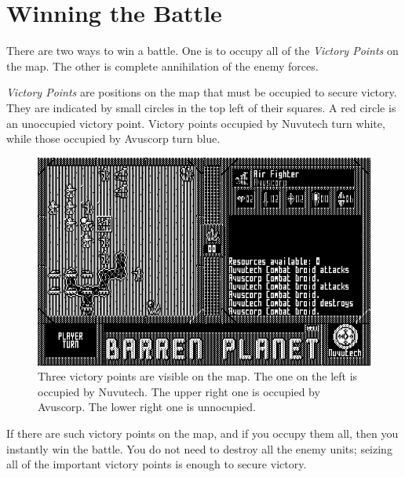 %
%
%
%

\chapter{Winning the Battle}

\noindent
There are two ways to win a battle. One is to occupy all of the {\it Victory Points} on the map. The other is complete annihilation of the enemy forces.

{\it Victory Points} are positions on the map that must be occupied to secure victory. They are indicated by small circles in the top left of their squares. A red circle is an unoccupied victory point. Victory points occupied by Nuvutech turn white, while those occupied by Avuscorp turn blue.

\begin{figure}[h]
  \includegraphics[width=\textwidth]{victory-points}
  \caption{Three victory points are visible on the map. The one on the left is occupied by Nuvutech. The upper right one is occupied by Avuscorp. The lower right one is unnocupied.}
\end{figure}

If there are such victory points on the map, and if you occupy them all, then you instantly win the battle. You do not need to destroy all the enemy units; seizing all of the important victory points is enough to secure victory.

